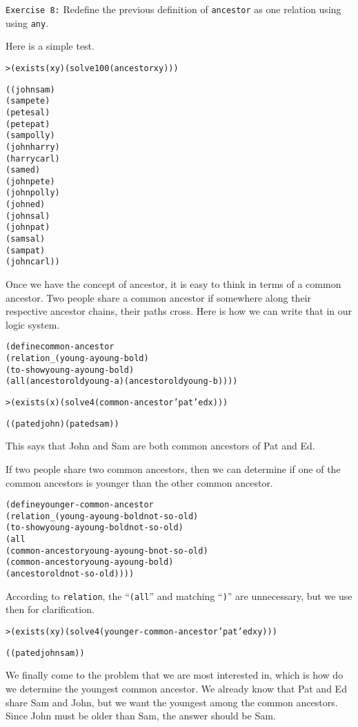 \texttt{Exercise 8:} Redefine the previous definition of
\texttt{ancestor} as one relation using using \texttt{any}.

Here is a simple test.

\begin{alltt}
> (exists (x y) (solve 100 (ancestor x y)))

((john sam)
 (sam pete)
 (pete sal)
 (pete pat)
 (sam polly)
 (john harry)
 (harry carl)
 (sam ed)
 (john pete)
 (john polly)
 (john ed)
 (john sal)
 (john pat)
 (sam sal)
 (sam pat)
 (john carl))
\end{alltt}

Once we have the concept of ancestor, it is easy to think in terms of
a common ancestor.  Two people share a common ancestor if somewhere
along their respective ancestor chains, their paths cross.  Here is
how we can write that in our logic system.
\newpage
\begin{alltt}
(define common-ancestor
  (relation _ (young-a young-b old)
    (to-show young-a young-b old)
    (all (ancestor old young-a) (ancestor old young-b))))

> (exists (x) (solve 4 (common-ancestor 'pat 'ed x)))

((pat ed john) (pat ed sam))
\end{alltt}

\noindent
This says that John and Sam are both common
ancestors of Pat and Ed.

If two people share two common ancestors, then we can determine if one
of the common ancestors is younger than the other common ancestor.

\begin{alltt}
(define younger-common-ancestor
  (relation _ (young-a young-b old not-so-old)
    (to-show young-a young-b old not-so-old)
    (all
      (common-ancestor young-a young-b not-so-old)
      (common-ancestor young-a young-b old)
      (ancestor old not-so-old))))
\end{alltt}

\noindent
According to \texttt{relation}, the ``\texttt{(all}'' and matching
``\texttt{)}'' are unnecessary, but we use then for clarification.

\begin{alltt}
> (exists (x y) (solve 4 (younger-common-ancestor 'pat 'ed x y)))

((pat ed john sam))
\end{alltt}

We finally come to the problem that we are most interested in, which
is how do we determine the youngest common ancestor.  We already know
that Pat and Ed share Sam and John, but we want the youngest among the
common ancestors. Since John must be older than Sam, the answer should
be Sam.

